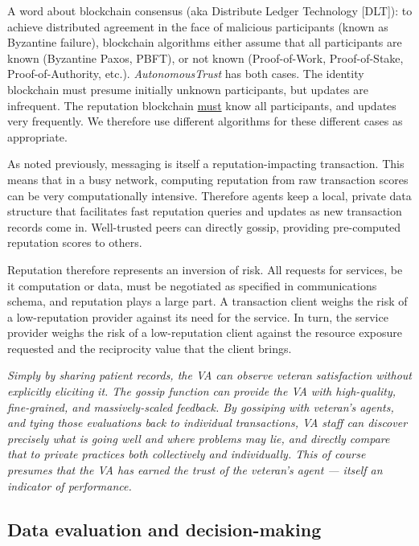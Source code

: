 \documentclass[10pt, twoside]{article}
\newenvironment{ppl}{\fontfamily{ppl}\selectfont\itshape}{\par}
\newcommand{\projectName}{\emph{AutonomousTrust }}
\begin{document}
A word about blockchain consensus (aka Distribute Ledger Technology [DLT]): to achieve distributed agreement in the face of malicious participants (known as Byzantine failure), blockchain algorithms either assume that all participants are known (Byzantine Paxos, PBFT), or not known (Proof-of-Work, Proof-of-Stake, Proof-of-Authority, etc.). \projectName has both cases. The identity blockchain must presume initially unknown participants, but updates are infrequent. The reputation blockchain \underline{must} know all participants, and updates very frequently. We therefore use different algorithms for these different cases as appropriate.

As noted previously, messaging is itself a reputation-impacting transaction. This means that in a busy network, computing reputation from raw transaction scores can be very computationally intensive. Therefore agents keep a local, private data structure that facilitates fast reputation queries and updates as new transaction records come in. Well-trusted peers can directly gossip, providing pre-computed reputation scores to others.

Reputation therefore represents an inversion of risk. All requests for services, be it computation or data, must be negotiated as specified in communications schema, and reputation plays a large part. A transaction client weighs the risk of a low-reputation provider against its need for the service. In turn, the service provider weighs the risk of a low-reputation client against the resource exposure requested and the reciprocity value that the client brings.

\begin{ppl}
Simply by sharing patient records, the VA can observe veteran satisfaction without explicitly eliciting it. The gossip function can provide the VA with high-quality, fine-grained, and massively-scaled feedback. By gossiping with veteran's agents, and tying those evaluations back to individual transactions, VA staff can discover precisely what is going well and where problems may lie, and directly compare that to private practices both collectively and individually. This of course presumes that the VA has earned the trust of the veteran's agent --- itself an indicator of performance.
\end{ppl}


\subsection{Data evaluation and decision-making} \label{eval}
\end{document}
